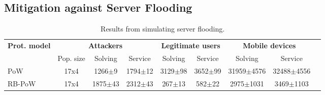 \begin{comment}
  \begin{table}[H]
    \centering
    \tiny
    \begin{tabular}{lcccccccc} \toprule
      \multicolumn{1}{c}{Prot. model} & \multicolumn{3}{c}{Attackers} & \multicolumn{2}{c}{Legitimate users} & \multicolumn{2}{c}{Mobile devices} \\
      \multicolumn{1}{c}{} & \multicolumn{1}{c}{Pop. size} & \multicolumn{1}{c}{Solving} & \multicolumn{1}{c}{Service} & \multicolumn{1}{c}{Solving} & \multicolumn{1}{c}{Service} & \multicolumn{1}{c}{Solving} & \multicolumn{1}{c}{Service}  \\ \toprule
      None & 120x7  & 0.57$\pm$0.02 &  19861.19$\pm$375.23 & 0.48$\pm$0.05 & 19965.45$\pm$1286.18 & 16.87$\pm$7.64 & 20800.60$\pm$3202.62     \\ \bottomrule
    \end{tabular}

    \caption{No protection}\label{tab:noprot}

  \end{table}
\end{comment}

\subsection{Mitigation against Server Flooding}
  \begin{table}[H]
    \centering
    \tiny
    \caption{Results from simulating server flooding. }\label{tab:flooding}

    \begin{tabularx}{1.05\textwidth}{lcccccccr{5cm}} \toprule
      \multicolumn{1}{c}{\textbf{Prot. model}} & \multicolumn{3}{c}{\textbf{Attackers}} & \multicolumn{2}{c}{\textbf{Legitimate users}} & \multicolumn{2}{c}{\textbf{Mobile devices}} \\
      \multicolumn{1}{c}{} & \multicolumn{1}{c}{Pop. size} & \multicolumn{1}{c}{Solving} & \multicolumn{1}{c}{Service} & \multicolumn{1}{c}{Solving} & \multicolumn{1}{c}{Service} & \multicolumn{1}{c}{Solving} & \multicolumn{1}{c}{Service}  \\ \toprule
      PoW & 17x4  & 1266$\pm$9 & 1794$\pm$12 & 3129$\pm$98 & 3652$\pm$99 & 31959$\pm$4576 & 32488$\pm$4556    \\
      RB-PoW & 17x4 & 1875$\pm$43 & 2312$\pm$43 & 267$\pm$13 & 582$\pm$22 & 2975$\pm$1031 & 3469$\pm$1103   \\ \bottomrule
    \end{tabularx}

  \end{table}


